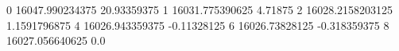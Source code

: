0 16047.990234375 20.93359375
1 16031.775390625 4.71875
2 16028.2158203125 1.1591796875
4 16026.943359375 -0.11328125
6 16026.73828125 -0.318359375
8 16027.056640625 0.0
